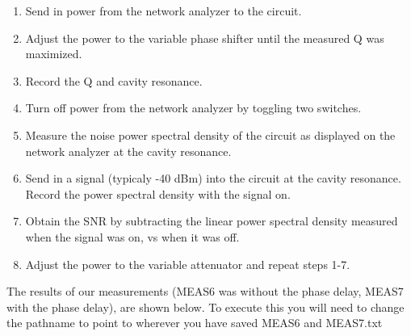 \documentclass{article}
\begin{document}
\begin{enumerate}
\def\labelenumi{\arabic{enumi}.}
\item
  Send in power from the network analyzer to the circuit.
\item
  Adjust the power to the variable phase shifter until the measured Q
  was maximized.
\item
  Record the Q and cavity resonance.
\item
  Turn off power from the network analyzer by toggling two switches.
\item
  Measure the noise power spectral density of the circuit as displayed
  on the network analyzer at the cavity resonance.
\item
  Send in a signal (typicaly -40 dBm) into the circuit at the cavity
  resonance. Record the power spectral density with the signal on.
\item
  Obtain the SNR by subtracting the linear power spectral density
  measured when the signal was on, vs when it was off.
\item
  Adjust the power to the variable attenuator and repeat steps 1-7.
\end{enumerate}

The results of our measurements (MEAS6 was without the phase delay,
MEAS7 with the phase delay), are shown below. To execute this you will
need to change the pathname to point to wherever you have saved MEAS6
and MEAS7.txt
\end{document}
